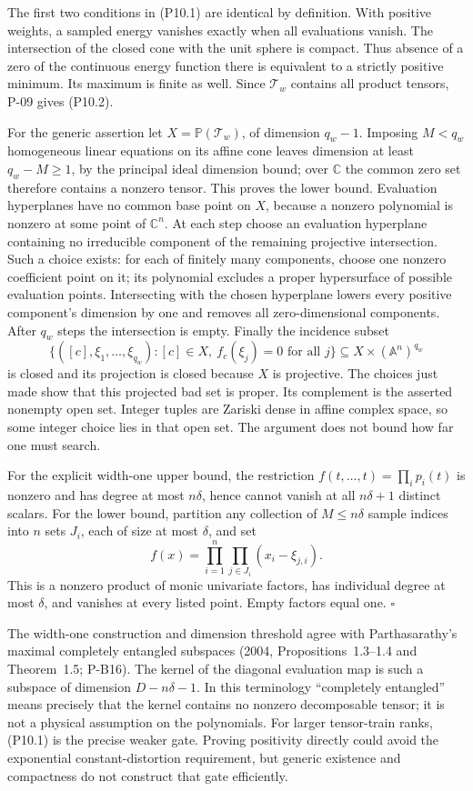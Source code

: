 \documentclass[11pt,a4paper]{article}
\theoremstyle{definition}\newtheorem{definition}{Definition}
\begin{document}
The first two conditions in (P10.1) are identical by definition. With positive weights, a sampled energy vanishes exactly when all evaluations vanish. The intersection of the closed cone with the unit sphere is compact. Thus absence of a zero of the continuous energy function there is equivalent to a strictly positive minimum. Its maximum is finite as well. Since $\mathcal T_w$ contains all product tensors, P-09 gives (P10.2).

For the generic assertion let $X=\mathbb P(\mathcal T_w)$, of dimension $q_w-1$. Imposing $M<q_w$ homogeneous linear equations on its affine cone leaves dimension at least $q_w-M\ge1$, by the principal ideal dimension bound; over $\mathbb C$ the common zero set therefore contains a nonzero tensor. This proves the lower bound. Evaluation hyperplanes have no common base point on $X$, because a nonzero polynomial is nonzero at some point of $\mathbb C^n$. At each step choose an evaluation hyperplane containing no irreducible component of the remaining projective intersection. Such a choice exists: for each of finitely many components, choose one nonzero coefficient point on it; its polynomial excludes a proper hypersurface of possible evaluation points. Intersecting with the chosen hyperplane lowers every positive component's dimension by one and removes all zero-dimensional components. After $q_w$ steps the intersection is empty. Finally the incidence subset
\[
 \{([c],\xi_1,\ldots,\xi_{q_w}):
      [c]\in X,\ f_c(\xi_j)=0\text{ for all }j\}
 \subseteq X\times(\mathbb A^n)^{q_w}
\]
is closed and its projection is closed because $X$ is projective. The choices just made show that this projected bad set is proper. Its complement is the asserted nonempty open set. Integer tuples are Zariski dense in affine complex space, so some integer choice lies in that open set. The argument does not bound how far one must search.

For the explicit width-one upper bound, the restriction
$f(t,\ldots,t)=\prod_i p_i(t)$ is nonzero and has degree at most $n\delta$, hence cannot vanish at all $n\delta+1$ distinct scalars. For the lower bound, partition any collection of $M\le n\delta$ sample indices into $n$ sets $J_i$, each of size at most $\delta$, and set
\[
 f(x)=\prod_{i=1}^n\prod_{j\in J_i}(x_i-\xi_{j,i}).
\]
This is a nonzero product of monic univariate factors, has individual degree at most $\delta$, and vanishes at every listed point. Empty factors equal one. $\square$

The width-one construction and dimension threshold agree with Parthasarathy's maximal completely entangled subspaces (2004, Propositions~1.3--1.4 and Theorem~1.5; P-B16). The kernel of the diagonal evaluation map is such a subspace of dimension $D-n\delta-1$. In this terminology ``completely entangled'' means precisely that the kernel contains no nonzero decomposable tensor; it is not a physical assumption on the polynomials. For larger tensor-train ranks, (P10.1) is the precise weaker gate. Proving positivity directly could avoid the exponential constant-distortion requirement, but generic existence and compactness do not construct that gate efficiently.
\end{document}
